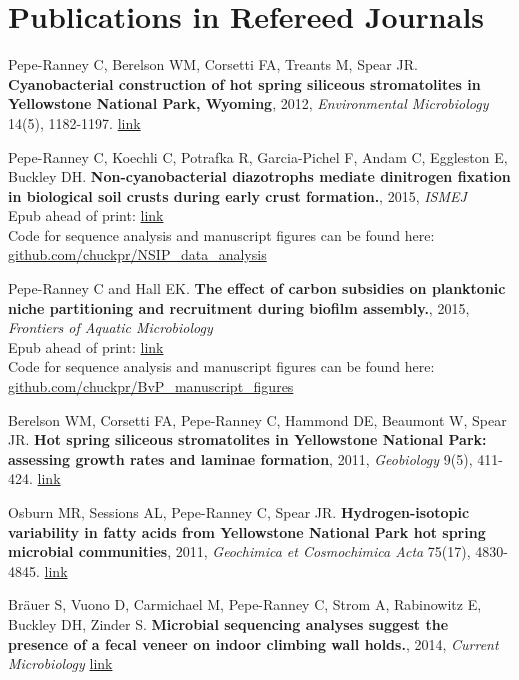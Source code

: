 \documentclass[letterpaper]{article}
\renewenvironment{itemize}{
  \begin{list}{}{
    \setlength{\leftmargin}{1.5em}
  }
}{
  \end{list}
}
\begin{document}
\section*{Publications in Refereed Journals}
\begin{itemize}
\item Pepe-Ranney C, Berelson WM, Corsetti FA, Treants M, Spear JR.
    \textbf{Cyanobacterial construction of hot spring siliceous stromatolites in
    Yellowstone National Park, Wyoming}, 2012, \textit{Environmental
    Microbiology} 14(5), 1182-1197. \href{http://www.ncbi.nlm.nih.gov/pubmed/22356555}{link} 
\item Pepe-Ranney C, Koechli C, Potrafka R, Garcia-Pichel F, Andam C, Eggleston E, Buckley DH. 
    \textbf{Non-cyanobacterial diazotrophs mediate dinitrogen fixation in
    biological soil crusts during early crust formation.}, 2015, \textit{ISMEJ}\\ 
    Epub ahead of print: \href{http://dx.doi.org/10.1101/013813}
    {link}\\
    Code for sequence analysis and manuscript figures can be found here:\\
    \href{http://www.github.com/chuckpr/NSIP_data_analysis}
    {github.com/chuckpr/NSIP\_data\_analysis}
\item Pepe-Ranney C and Hall EK. \textbf{The effect of carbon subsidies on
    planktonic niche partitioning and recruitment during biofilm
    assembly.}, 2015, \textit{Frontiers of Aquatic Microbiology}\\
    Epub ahead of print: \href{http://journal.frontiersin.org/article/10.3389/fmicb.2015.00703/abstract}
    {link}\\
    Code for sequence analysis and manuscript figures can be found here: \\
    \href{http://www.github.com/chuckpr/BvP_manuscript_figures/}
    {github.com/chuckpr/BvP\_manuscript\_figures}
\item Berelson WM, Corsetti FA, Pepe-Ranney C, Hammond DE, Beaumont W, Spear
    JR. \textbf{Hot spring siliceous stromatolites in Yellowstone National Park:
    assessing growth rates and laminae formation}, 2011, {\it Geobiology}
    9(5), 411-424. \href{http://www.ncbi.nlm.nih.gov/pubmed/21777367}{link}
\item Osburn MR, Sessions AL, Pepe-Ranney C, Spear JR. \textbf{Hydrogen-isotopic
    variability in fatty acids from Yellowstone National Park hot spring
    microbial communities}, 2011, {\it Geochimica et Cosmochimica Acta}
    75(17), 4830-4845.
    \href{http://www.sciencedirect.com/science/article/pii/S0016703711003152}{link}
\item Br\"{a}uer S, Vuono D, Carmichael M, Pepe-Ranney C, Strom A, Rabinowitz
    E, Buckley DH, Zinder S. \textbf{Microbial sequencing analyses suggest
    the presence of a fecal veneer on indoor climbing wall holds.}, 2014, {\it
    Current Microbiology} \href{http://www.ncbi.nlm.nih.gov/pubmed/24972665}{link}
\end{itemize}
\end{document}
